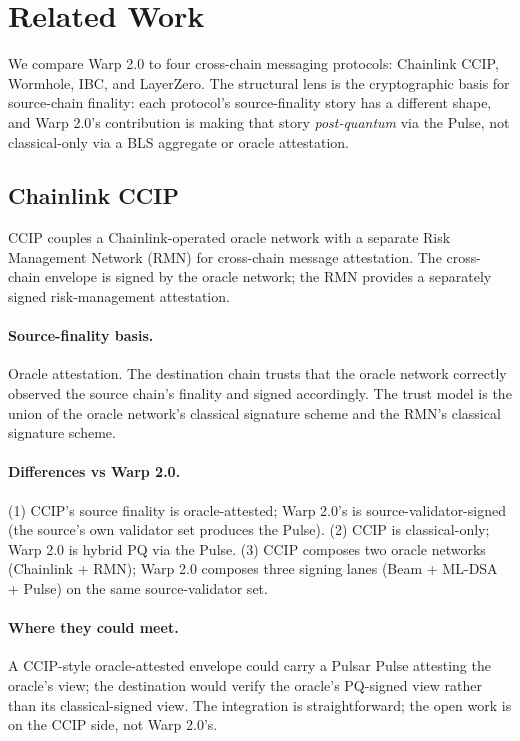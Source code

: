 \section{Related Work}
\label{sec:warp-related-work}

We compare Warp 2.0 to four cross-chain messaging protocols: Chainlink CCIP, Wormhole, IBC, and LayerZero. The structural lens is the cryptographic basis for source-chain finality: each protocol's source-finality story has a different shape, and Warp 2.0's contribution is making that story \emph{post-quantum} via the Pulse, not classical-only via a BLS aggregate or oracle attestation.

\subsection{Chainlink CCIP}

CCIP \cite{ccip} couples a Chainlink-operated oracle network with a separate Risk Management Network (RMN) for cross-chain message attestation. The cross-chain envelope is signed by the oracle network; the RMN provides a separately signed risk-management attestation.

\paragraph{Source-finality basis.} Oracle attestation. The destination chain trusts that the oracle network correctly observed the source chain's finality and signed accordingly. The trust model is the union of the oracle network's classical signature scheme and the RMN's classical signature scheme.

\paragraph{Differences vs Warp 2.0.} (1) CCIP's source finality is oracle-attested; Warp 2.0's is source-validator-signed (the source's own validator set produces the Pulse). (2) CCIP is classical-only; Warp 2.0 is hybrid PQ via the Pulse. (3) CCIP composes two oracle networks (Chainlink + RMN); Warp 2.0 composes three signing lanes (Beam + ML-DSA + Pulse) on the same source-validator set.

\paragraph{Where they could meet.} A CCIP-style oracle-attested envelope could carry a Pulsar Pulse attesting the oracle's view; the destination would verify the oracle's PQ-signed view rather than its classical-signed view. The integration is straightforward; the open work is on the CCIP side, not Warp 2.0's.


